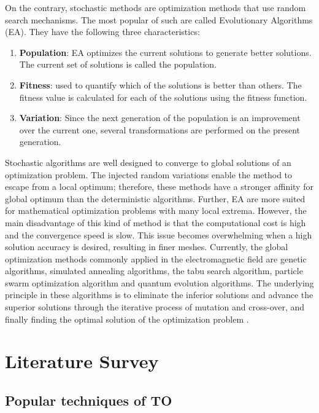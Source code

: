 On the contrary, stochastic  methods  are  optimization  methods  that  use  random search mechanisms. The most popular of such are called Evolutionary Algorithms (EA). They have the following three characteristics:

\begin{enumerate}
    \item \textbf{Population}: EA optimizes the current solutions to generate better solutions. The current set of solutions is called the population.
    \item \textbf{Fitness}: used to quantify which of the solutions is better than others. The fitness value is calculated for each of the solutions using the fitness function.
    \item \textbf{Variation}: Since the next generation of the population is an improvement over the current one, several transformations are performed on the present generation.
\end{enumerate}

Stochastic algorithms are well designed to converge to global solutions of an optimization problem. The injected random variations enable the method to escape from a local optimum; therefore, these methods have a stronger affinity for global optimum than the deterministic algorithms. Further, EA are more suited for mathematical optimization problems with many local extrema. However, the main disadvantage of this kind of method is that the computational cost is high and the convergence speed is slow. This issue becomes overwhelming when a high solution accuracy is desired, resulting in finer meshes. Currently, the global optimization methods commonly applied in the electromagnetic field are genetic  algorithms,  simulated  annealing  algorithms, the tabu  search  algorithm,  particle  swarm optimization  algorithm and quantum  evolution  algorithms.  The  underlying principle  in  these algorithms  is  to  eliminate  the  inferior  solutions and advance the superior  solutions through  the iterative  process of mutation and cross-over,  and  finally  finding  the  optimal  solution  of  the  optimization problem \parencite{li2019numerical}.

\section{Literature Survey}

\subsection{Popular techniques of TO}

